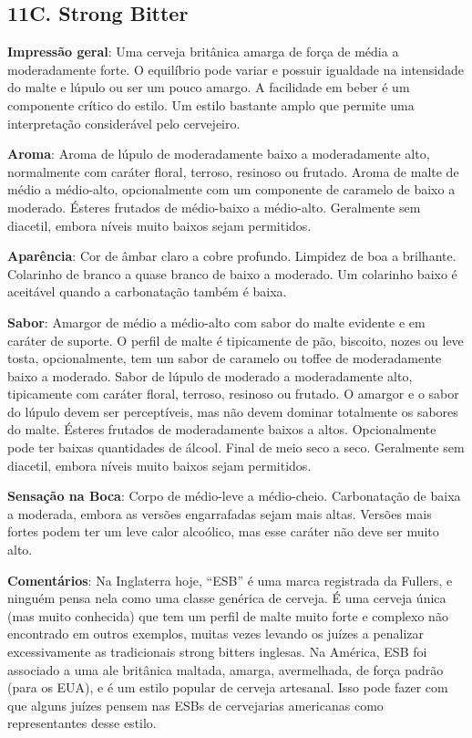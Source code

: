 \subsection*{11C. Strong Bitter}
\textbf{Impressão geral}: Uma cerveja britânica amarga de força de média a moderadamente forte. O equilíbrio pode variar e possuir igualdade na intensidade do malte e lúpulo ou ser um pouco amargo. A facilidade em beber é um componente crítico do estilo. Um estilo bastante amplo que permite uma interpretação considerável pelo cervejeiro.

\textbf{Aroma}: Aroma de lúpulo de moderadamente baixo a moderadamente alto, normalmente com caráter floral, terroso, resinoso ou frutado. Aroma de malte de médio a médio-alto, opcionalmente com um componente de caramelo de baixo a moderado. Ésteres frutados de médio-baixo a médio-alto. Geralmente sem diacetil, embora níveis muito baixos sejam permitidos.

\textbf{Aparência}: Cor de âmbar claro a cobre profundo. Limpidez de boa a brilhante. Colarinho de branco a quase branco de baixo a moderado. Um colarinho baixo é aceitável quando a carbonatação também é baixa.

\textbf{Sabor}: Amargor de médio a médio-alto com sabor do malte evidente e em caráter de suporte. O perfil de malte é tipicamente de pão, biscoito, nozes ou leve tosta, opcionalmente, tem um sabor de caramelo ou toffee de moderadamente baixo a moderado. Sabor de lúpulo de moderado a moderadamente alto, tipicamente com caráter floral, terroso, resinoso ou frutado. O amargor e o sabor do lúpulo devem ser perceptíveis, mas não devem dominar totalmente os sabores do malte. Ésteres frutados de moderadamente baixos a altos. Opcionalmente pode ter baixas quantidades de álcool. Final de meio seco a seco. Geralmente sem diacetil, embora níveis muito baixos sejam permitidos.

\textbf{Sensação na Boca}: Corpo de médio-leve a médio-cheio. Carbonatação de baixa a moderada, embora as versões engarrafadas sejam mais altas. Versões mais fortes podem ter um leve calor alcoólico, mas esse caráter não deve ser muito alto.

\textbf{Comentários}: Na Inglaterra hoje, “ESB” é uma marca registrada da Fullers, e ninguém pensa nela como uma classe genérica de cerveja. É uma cerveja única (mas muito conhecida) que tem um perfil de malte muito forte e complexo não encontrado em outros exemplos, muitas vezes levando os juízes a penalizar excessivamente as tradicionais strong bitters inglesas. Na América, ESB foi associado a uma ale britânica maltada, amarga, avermelhada, de força padrão (para os EUA), e é um estilo popular de cerveja artesanal. Isso pode fazer com que alguns juízes pensem nas ESBs de cervejarias americanas como representantes desse estilo.

